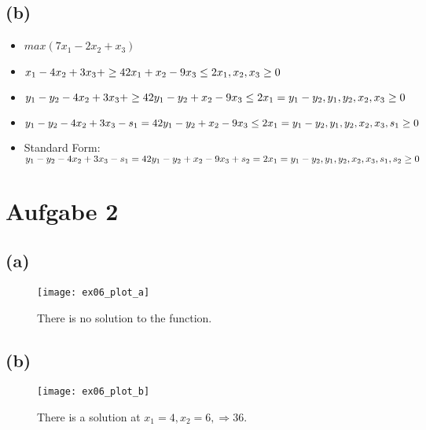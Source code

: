 \documentclass[a4paper]{scrartcl}
\begin{document}
\subsection*{(b)}
\begin{itemize}
\item $max(7x_1 - 2x_2 + x_3)$
\item
$
x_1 - 4x_2 + 3x_3 + \geq 42\\
x_1 + x_2 - 9x_3 \leq 2\\
x_1, x_2, x_3 \geq 0
$
\\
\item
$
y_1 - y_2 - 4x_2 + 3x_3 + \geq 42\\
y_1 - y_2 + x_2 - 9x_3 \leq 2\\
x_1 = y_1 - y_2, y_1, y_2, x_2, x_3 \geq 0
$
\\
\item
$
y_1 - y_2 - 4x_2 + 3x_3 - s_1 = 42\\
y_1 - y_2 + x_2 - 9x_3 \leq 2\\
x_1 = y_1 - y_2, y_1, y_2, x_2, x_3, s_1 \geq 0
$
\\
\item
Standard Form:\\
$
y_1 - y_2 - 4x_2 + 3x_3 - s_1 = 42\\
y_1 - y_2 + x_2 - 9x_3 + s_2 = 2\\
x_1 = y_1 - y_2, y_1, y_2, x_2, x_3, s_1, s_2 \geq 0
$
\end{itemize}


\section*{Aufgabe 2}

\subsection*{(a)}
\begin{figure}[H]
	\texttt{[image: ex06\_plot\_a]}
	\caption{There is no solution to the function.}
\end{figure}



\subsection*{(b)}
\begin{figure}[H]
	\texttt{[image: ex06\_plot\_b]}
	\caption{There is a solution at $x_1 = 4, x_2 = 6, \Rightarrow 36$.}
\end{figure}
\end{document}
